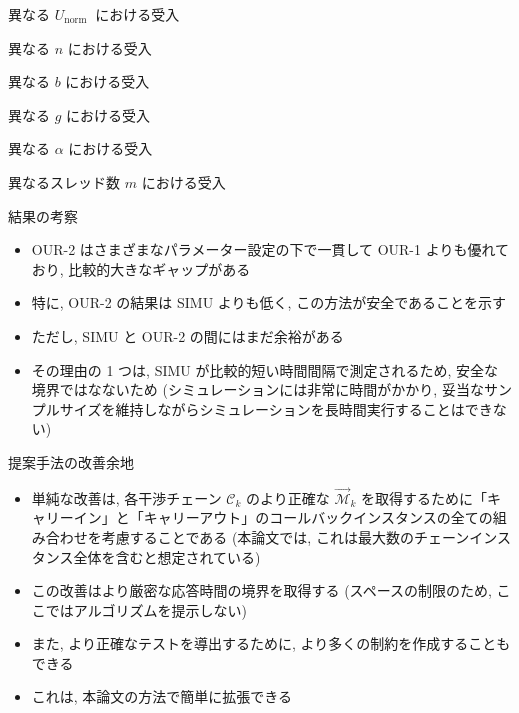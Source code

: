 \begin{frame}{異なる $U_{\text {norm }}$ における受入}
\end{frame}

\begin{frame}{異なる $n$ における受入}
\end{frame}

\begin{frame}{異なる $b$ における受入}
\end{frame}

\begin{frame}{異なる $g$ における受入}
\end{frame}

\begin{frame}{異なる $\alpha$ における受入}
\end{frame}

\begin{frame}{異なるスレッド数 $m$ における受入}
\end{frame}

\begin{frame}{結果の考察}
    \begin{itemize}
        \item OUR-2 はさまざまなパラメーター設定の下で一貫して OUR-1 よりも優れており, 比較的大きなギャップがある
        \item 特に, OUR-2 の結果は SIMU よりも低く, この方法が安全であることを示す
        \item ただし, SIMU と OUR-2 の間にはまだ余裕がある
        \item その理由の 1 つは, SIMU が比較的短い時間間隔で測定されるため, 安全な境界ではなないため (シミュレーションには非常に時間がかかり, 妥当なサンプルサイズを維持しながらシミュレーションを長時間実行することはできない)
    \end{itemize}
\end{frame}

\begin{frame}{提案手法の改善余地}
    \begin{itemize}
        \item 単純な改善は, 各干渉チェーン $\mathcal{C}_{k}$ のより正確な $\overrightarrow{\mathcal{M}}_{k}$ を取得するために「キャリーイン」と「キャリーアウト」のコールバックインスタンスの全ての組み合わせを考慮することである (本論文では, これは最大数のチェーンインスタンス全体を含むと想定されている)
        \item この改善はより厳密な応答時間の境界を取得する (スペースの制限のため, ここではアルゴリズムを提示しない)
        \item また, より正確なテストを導出するために, より多くの制約を作成することもできる
        \item これは, 本論文の方法で簡単に拡張できる
    \end{itemize}
\end{frame}


